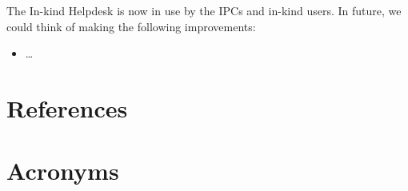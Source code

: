 \documentclass[authoryear,toc]{lsstdoc}
\begin{document}
The In-kind Helpdesk is now in use by the IPCs and in-kind users. 
In future, we could think of making the following improvements:

\begin{itemize}
\item \ldots
\end{itemize}
 

\appendix
\section{References} \label{sec:bib}
\renewcommand{\refname}{} %


\section{Acronyms} \label{sec:acronyms}

\end{document}
